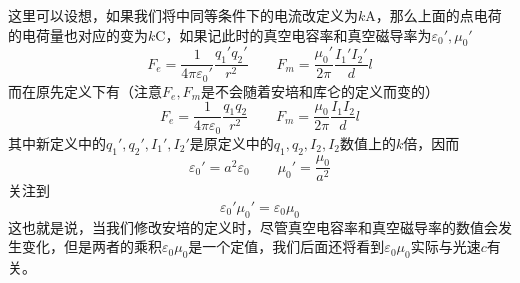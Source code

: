 这里可以设想，如果我们将中同等条件下的电流改定义为$k$\si{A}，那么上面的点电荷的电荷量也对应的变为$k$\si{C}，如果记此时的真空电容率和真空磁导率为$\varepsilon_0',\mu_0'$
\begin{equation*}
    F_e=\frac{1}{4\pi\varepsilon_0'}\frac{q_1'q_2'}{r^2}\qquad 
    F_m=\frac{\mu_0'}{2\pi}\frac{I_1'I_2'}{d}l
\end{equation*}
而在原先定义下有（注意$F_e,F_m$是不会随着安培和库仑的定义而变的）
\begin{equation*}
    F_e=\frac{1}{4\pi\varepsilon_0}\frac{q_1q_2}{r^2}\qquad 
    F_m=\frac{\mu_0}{2\pi}\frac{I_1I_2}{d}l
\end{equation*}
其中新定义中的$q_1',q_2',I_1',I_2'$是原定义中的$q_1,q_2,I_2,I_2$数值上的$k$倍，因而
\begin{equation*}
    \varepsilon_0'=a^2\varepsilon_0\qquad
    \mu_0'=\frac{\mu_0}{a^2}
\end{equation*}
关注到
\begin{equation*}
    \varepsilon_0'\mu_0'=\varepsilon_0\mu_0
\end{equation*}
这也就是说，当我们修改安培的定义时，尽管真空电容率和真空磁导率的数值会发生变化，但是两者的乘积$\varepsilon_0\mu_0$是一个定值，我们后面还将看到$\varepsilon_0\mu_0$实际与光速$c$有关。

